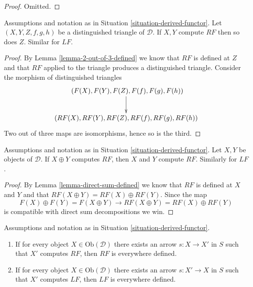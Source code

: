 \begin{proof}
Omitted.
\end{proof}

\begin{lemma}
\label{lemma-2-out-of-3-computes}
Assumptions and notation as in
Situation \ref{situation-derived-functor}.
Let $(X, Y, Z, f, g, h)$ be a distinguished triangle of $\mathcal{D}$.
If $X, Y$ compute $RF$ then so does $Z$. Similar for $LF$.
\end{lemma}

\begin{proof}
By
Lemma \ref{lemma-2-out-of-3-defined}
we know that $RF$ is defined at $Z$ and that $RF$ applied to the
triangle produces a distinguished triangle.
Consider the morphism of distinguished triangles
$$
\xymatrix{\
(F(X), F(Y), F(Z), F(f), F(g), F(h)) \ar[d] \\
(RF(X), RF(Y), RF(Z), RF(f), RF(g), RF(h))
}
$$
Two out of three maps are isomorphisms, hence so is the third.
\end{proof}

\begin{lemma}
\label{lemma-direct-sum-computes}
Assumptions and notation as in
Situation \ref{situation-derived-functor}.
Let $X, Y$ be objects of $\mathcal{D}$.
If $X \oplus Y$ computes $RF$, then $X$ and $Y$ compute $RF$.
Similarly for $LF$.
\end{lemma}

\begin{proof}
By
Lemma \ref{lemma-direct-sum-defined}
we know that $RF$ is defined at $X$ and $Y$ and that
$RF(X \oplus Y) = RF(X) \oplus RF(Y)$.
Since the map
$$
F(X) \oplus F(Y) = F(X \oplus Y) \longrightarrow
RF(X \oplus Y) = RF(X) \oplus RF(Y)
$$
is compatible with direct sum decompositions we win.
\end{proof}

\begin{lemma}
\label{lemma-existence-computes}
Assumptions and notation as in
Situation \ref{situation-derived-functor}.
\begin{enumerate}
\item If for every object $X \in \text{Ob}(\mathcal{D})$
there exists an arrow $s : X \to X'$ in $S$ such that $X'$ computes
$RF$, then $RF$ is everywhere defined.
\item If for every object $X \in \text{Ob}(\mathcal{D})$
there exists an arrow $s : X' \to X$ in $S$ such that $X'$ computes
$LF$, then $LF$ is everywhere defined.
\end{enumerate}
\end{lemma}

